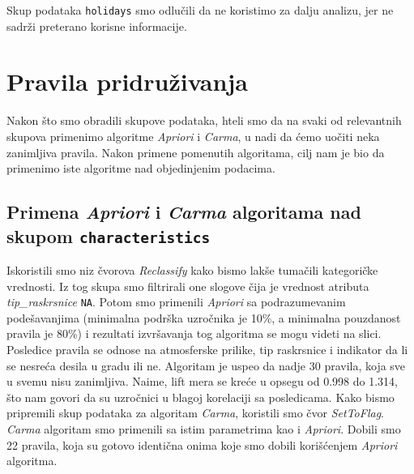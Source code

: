 \documentclass[a4paper,10pt]{article}
\begin{document}
Skup podataka \texttt{holidays} smo odlučili da ne koristimo za dalju analizu, jer ne sadrži preterano korisne informacije.

\section{Pravila pridruživanja}
Nakon što smo obradili skupove podataka, hteli smo da na svaki od relevantnih skupova primenimo algoritme \textit{Apriori} i \textit{Carma},
u nadi da ćemo uočiti neka zanimljiva pravila. Nakon primene pomenutih algoritama, cilj nam je bio da primenimo iste algoritme nad objedinjenim podacima.

\subsection{Primena \textit{Apriori} i \textit{Carma} algoritama nad skupom \texttt{characteristics}}
Iskoristili smo niz čvorova \textit{Reclassify} kako bismo lakše tumačili kategoričke vrednosti. Iz tog skupa smo filtrirali one slogove čija je 
vrednost atributa \textit{tip\_raskrsnice} \texttt{NA}. Potom smo primenili \textit{Apriori} sa podrazumevanim podešavanjima 
(minimalna podrška uzročnika je 10\%, a minimalna pouzdanost pravila je 80\%) i rezultati izvršavanja
tog algoritma se mogu videti na slici. Posledice pravila se odnose na atmosferske prilike, tip raskrsnice i indikator da li se nesreća desila u gradu ili ne.
Algoritam je uspeo da nadje 30 pravila, koja sve u svemu nisu zanimljiva. Naime, lift mera se kreće u opsegu od 0.998 do 1.314, što nam govori da su
uzročnici u blagoj korelaciji sa posledicama. Kako bismo pripremili skup podataka za algoritam \textit{Carma}, koristili smo čvor \textit{SetToFlag}. 
\textit{Carma} algoritam smo primenili sa istim parametrima kao i \textit{Apriori}. Dobili smo 22 pravila, koja su gotovo identična onima koje smo
dobili korišćenjem \textit{Apriori} algoritma. \\
 
\end{document}
